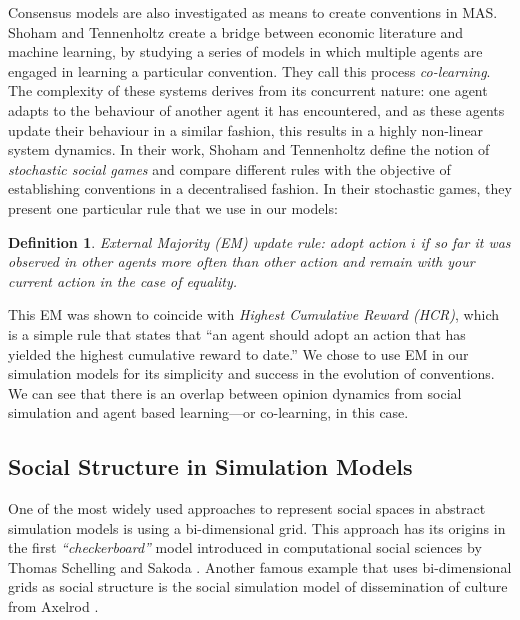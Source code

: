 \documentclass[preprint,number]{elsarticle}
\newtheorem{mydef}{Definition}
\begin{document}
	Consensus models are also investigated as means to create conventions in MAS. Shoham and Tennenholtz \cite{Shoham1994} create a bridge between economic literature and machine learning, by studying a series of models in which multiple agents are engaged in learning a particular convention. They call this process \textit{co-learning}. The complexity of these systems derives from its concurrent nature: one agent adapts to the behaviour of another agent it has encountered, and as these agents update their behaviour in a similar fashion, this results in a highly non-linear system dynamics. In their work, Shoham and Tennenholtz define the notion of \textit{stochastic social games} and compare different rules with the objective of establishing conventions in a decentralised fashion. In their stochastic games, they present one particular rule that we use in our models: 
	
	\begin{mydef}
		\label{def:external-majority}
		\textit{External Majority (EM)} update rule: adopt action $i$ if so far it was observed in other agents more often than other action and remain with your current action in the case of equality. 
	\end{mydef}
	
	This EM was shown to coincide with \textit{Highest Cumulative Reward (HCR)}, which is a simple rule that states that ``an agent should adopt an action that has yielded the highest cumulative reward to date.'' We chose to use EM in our simulation models for its simplicity and success in the evolution of conventions. We can see that there is an overlap between opinion dynamics from social simulation and agent based learning---or co-learning, in this case.
	
	\subsection{Social Structure in Simulation Models}
	One of the most widely used approaches to represent social spaces in abstract simulation models is using a  bi-dimensional grid. This approach has its origins in the first \textit{``checkerboard''} model introduced in computational social sciences by Thomas Schelling \cite{Schelling1971} and Sakoda \cite{Sakoda1971}. Another famous example that uses bi-dimensional grids as social structure is the social simulation model of dissemination of culture from Axelrod \cite{Axelrod1997}.
	
\end{document}
